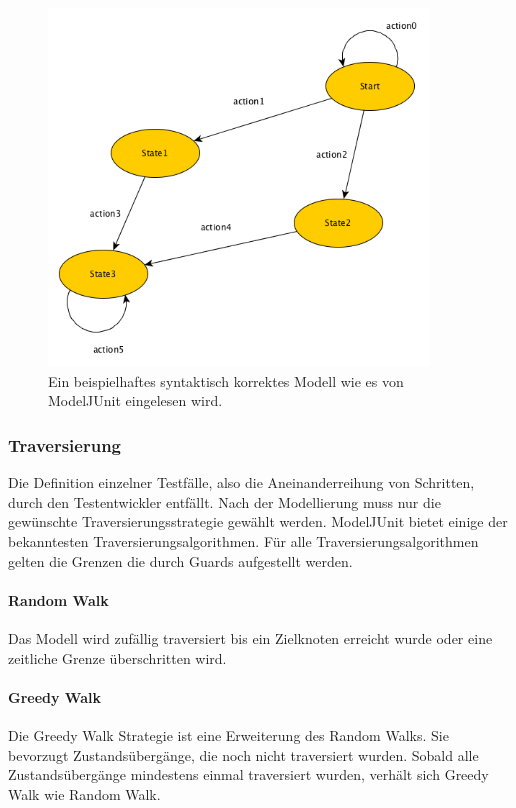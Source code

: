 \begin{figure}[h] 
  \centering
     \includegraphics[width=0.9\textwidth]{figures/modelljunit_modell.png}
  \caption{Ein beispielhaftes syntaktisch korrektes Modell wie es von ModelJUnit eingelesen wird.}
  \label{fig:modeljunit}
\end{figure}

\subsubsection{Traversierung}
Die Definition einzelner Testfälle, also die Aneinanderreihung von Schritten, durch den Testentwickler entfällt. Nach der Modellierung muss nur die gewünschte Traversierungsstrategie gewählt werden. ModelJUnit bietet einige der bekanntesten Traversierungsalgorithmen. Für alle Traversierungsalgorithmen gelten die Grenzen die durch Guards aufgestellt werden.

\paragraph{Random Walk}
Das Modell wird zufällig traversiert bis ein Zielknoten erreicht wurde oder eine zeitliche Grenze überschritten wird.

\paragraph{Greedy Walk}
Die Greedy Walk Strategie ist eine Erweiterung des Random Walks. Sie bevorzugt Zustandsübergänge, die noch nicht traversiert wurden. Sobald alle Zustandsübergänge mindestens einmal traversiert wurden, verhält sich Greedy Walk wie Random Walk.

